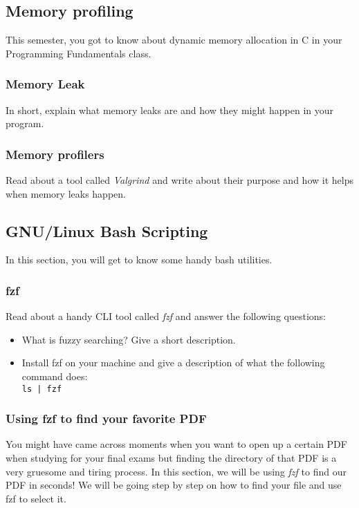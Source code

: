 \documentclass[12pt]{article}
\begin{document}
	\subsection{Memory profiling}
	This semester, you got to know about dynamic memory allocation in C in your Programming Fundamentals class.
	
	\subsubsection{Memory Leak}
	In short, explain what memory leaks are and how they might happen in your program.
	
	\subsubsection{Memory profilers}
	Read about a tool called \textit{Valgrind} and write about their purpose and how it helps when memory leaks happen.
	
	\subsection{GNU/Linux Bash Scripting}
	In this section, you will get to know some handy bash utilities.
	
	\subsubsection{fzf}
	Read about a handy CLI tool called \textit{fzf} and answer the following questions:
	
	\begin{itemize}
		\item What is fuzzy searching? Give a short description.
		\item Install fzf on your machine and give a description of what the following command does:\\
		\texttt{ls | fzf}
	\end{itemize}
	
	\subsubsection{Using fzf to find your favorite PDF}
	You might have came across moments when you want to open up a certain PDF when studying for your final exams but finding the directory of that
	PDF is a very gruesome and tiring process. In this section, we will be using \textit{fzf} to find our PDF in seconds! We will be going step by step
	on how to find your file and use fzf to select it.
	
\end{document}
